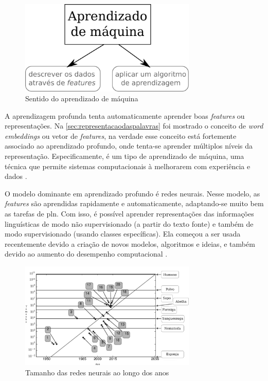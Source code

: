 \begin{figure}
\centering
\caption{Sentido do aprendizado de máquina} \label{fig:sentidoadm}
\includegraphics[width=0.75\textwidth]{img/sentidoadm}
\end{figure}

A aprendizagem profunda tenta automaticamente aprender boas \textit{features} ou representações. Na \autoref{sec:representacaodaspalavras} foi mostrado o conceito de \textit{word embeddings} ou vetor de \textit{features}, na verdade esse conceito está fortemente associado ao aprendizado profundo, onde tenta-se aprender múltiplos níveis da representação. Especificamente, é um tipo de aprendizado de máquina, uma técnica que permite sistemas computacionais à melhorarem com experiência e dados \cite{bengio2015deep}.

O modelo dominante em aprendizado profundo é redes neurais. Nesse modelo, as \textit{features} são aprendidas rapidamente e automaticamente, adaptando-se muito bem as tarefas de \ac{pln}. Com isso, é possível aprender representações das informações linguísticas de modo não supervisionado (a partir do texto fonte) e também de modo supervisionado (usando classes específicas). Ela começou a ser usada recentemente devido a criação de novos modelos, algoritmos e ideias, e também devido ao aumento do desempenho computacional \cite{deeplearningfornlp}.

\begin{figure}
\centering
\caption{Tamanho das redes neurais ao longo dos anos} \label{fig:aumentorntam}
\includegraphics[width=0.75\textwidth]{img/aumentorntam.pdf}
\end{figure}

